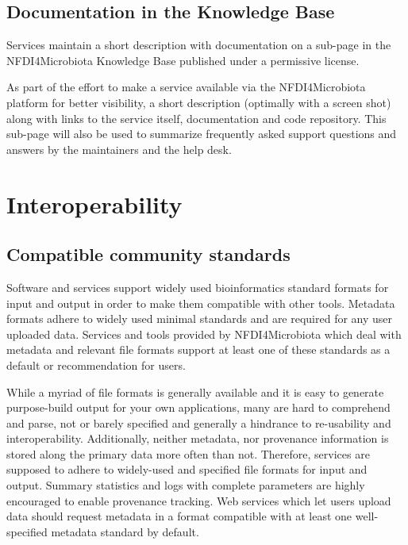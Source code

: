 \documentclass[
  paper=a4,
  ,captions=tableheading
]{scrartcl}
\renewenvironment{quote}{\begin{shaded*}\begin{em}}{\end{em}\end{shaded*}}
\renewenvironment{quote}{\begin{customblockquote}\list{}{\rightmargin=0em\leftmargin=0em}%
\item\relax\color{blockquote-text}\ignorespaces}{\unskip\unskip\endlist\end{customblockquote}}
\begin{document}
\hypertarget{documentation-in-the-knowledge-base}{%
\subsection{Documentation in the Knowledge
Base}\label{documentation-in-the-knowledge-base}}

Services maintain a short description with documentation on a sub-page
in the NFDI4Microbiota Knowledge Base published under a permissive
license.

\begin{quote}
As part of the effort to make a service available via the
NFDI4Microbiota platform for better visibility, a short description
(optimally with a screen shot) along with links to the service itself,
documentation and code repository. This sub-page will also be used to
summarize frequently asked support questions and answers by the
maintainers and the help desk.
\end{quote}

\hypertarget{interoperability}{%
\section{Interoperability}\label{interoperability}}

\hypertarget{compatible-community-standards}{%
\subsection{Compatible community
standards}\label{compatible-community-standards}}

Software and services support widely used bioinformatics standard
formats for input and output in order to make them compatible with other
tools. Metadata formats adhere to widely used minimal standards and are
required for any user uploaded data. Services and tools provided by
NFDI4Microbiota which deal with metadata and relevant file formats
support at least one of these standards as a default or recommendation
for users.

\begin{quote}
While a myriad of file formats is generally available and it is easy to
generate purpose-build output for your own applications, many are hard
to comprehend and parse, not or barely specified and generally a
hindrance to re-usability and interoperability. Additionally, neither
metadata, nor provenance information is stored along the primary data
more often than not. Therefore, services are supposed to adhere to
widely-used and specified file formats for input and output. Summary
statistics and logs with complete parameters are highly encouraged to
enable provenance tracking. Web services which let users upload data
should request metadata in a format compatible with at least one
well-specified metadata standard by default.
\end{quote}
\end{document}
